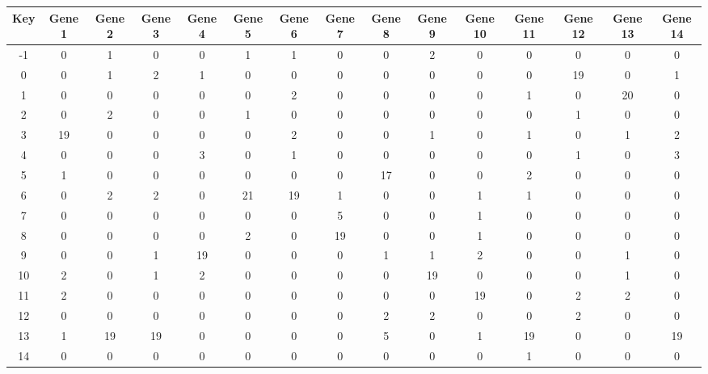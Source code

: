\begin{tabular}{|c|c|c|c|c|c|c|c|c|c|c|c|c|c|c|}
\hline
Key & Gene 1 & Gene 2 & Gene 3 & Gene 4 & Gene 5 & Gene 6 & Gene 7 & Gene 8 & Gene 9 & Gene 10 & Gene 11 & Gene 12 & Gene 13 & Gene 14 \\
\hline
-1 & 0 & 1 & 0 & 0 & 1 & 1 & 0 & 0 & 2 & 0 & 0 & 0 & 0 & 0 \\
0 & 0 & 1 & 2 & 1 & 0 & 0 & 0 & 0 & 0 & 0 & 0 & 19 & 0 & 1 \\
1 & 0 & 0 & 0 & 0 & 0 & 2 & 0 & 0 & 0 & 0 & 1 & 0 & 20 & 0 \\
2 & 0 & 2 & 0 & 0 & 1 & 0 & 0 & 0 & 0 & 0 & 0 & 1 & 0 & 0 \\
3 & 19 & 0 & 0 & 0 & 0 & 2 & 0 & 0 & 1 & 0 & 1 & 0 & 1 & 2 \\
4 & 0 & 0 & 0 & 3 & 0 & 1 & 0 & 0 & 0 & 0 & 0 & 1 & 0 & 3 \\
5 & 1 & 0 & 0 & 0 & 0 & 0 & 0 & 17 & 0 & 0 & 2 & 0 & 0 & 0 \\
6 & 0 & 2 & 2 & 0 & 21 & 19 & 1 & 0 & 0 & 1 & 1 & 0 & 0 & 0 \\
7 & 0 & 0 & 0 & 0 & 0 & 0 & 5 & 0 & 0 & 1 & 0 & 0 & 0 & 0 \\
8 & 0 & 0 & 0 & 0 & 2 & 0 & 19 & 0 & 0 & 1 & 0 & 0 & 0 & 0 \\
9 & 0 & 0 & 1 & 19 & 0 & 0 & 0 & 1 & 1 & 2 & 0 & 0 & 1 & 0 \\
10 & 2 & 0 & 1 & 2 & 0 & 0 & 0 & 0 & 19 & 0 & 0 & 0 & 1 & 0 \\
11 & 2 & 0 & 0 & 0 & 0 & 0 & 0 & 0 & 0 & 19 & 0 & 2 & 2 & 0 \\
12 & 0 & 0 & 0 & 0 & 0 & 0 & 0 & 2 & 2 & 0 & 0 & 2 & 0 & 0 \\
13 & 1 & 19 & 19 & 0 & 0 & 0 & 0 & 5 & 0 & 1 & 19 & 0 & 0 & 19 \\
14 & 0 & 0 & 0 & 0 & 0 & 0 & 0 & 0 & 0 & 0 & 1 & 0 & 0 & 0 \\
\hline
\end{tabular}